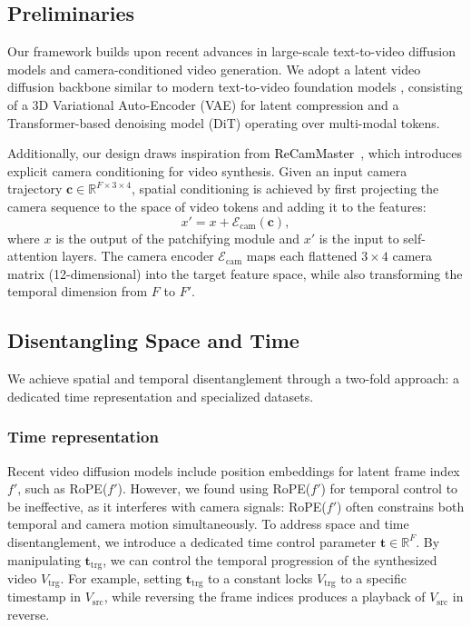 \documentclass[10pt,twocolumn,letterpaper]{article}
\newcommand{\nameCOLOR}[1]{\textcolor{black}{#1}}
\newcommand{\recammaster}{\nameCOLOR{\mbox{ReCamMaster}}\xspace}
\newcommand{\src}{\text{src}}
\newcommand{\trg}{\text{trg}}
\newcommand{\sourcevideo}{V_{\src}}
\newcommand{\targetvideo}{V_{\trg}}
\newcommand{\camera}{\mathbf{c}}
\newcommand{\animatime}{\mathbf{t}}
\newcommand{\numf}{F}
\newcommand{\numflt}{F'}
\newcommand{\camencoder}{\mathcal{E}_\text{cam}}
\begin{document}
\subsection{Preliminaries}
Our framework builds upon recent advances in large-scale text-to-video diffusion models and camera-conditioned video generation. 
We adopt a latent video diffusion backbone similar to modern text-to-video foundation models \cite{wan2025}, consisting of a 3D Variational Auto-Encoder (VAE) for latent compression and a Transformer-based denoising model (DiT) operating over multi-modal tokens. 

Additionally, our design draws inspiration from \recammaster~\cite{Bai2025}, which introduces explicit camera conditioning for video synthesis. 
Given an input camera trajectory $\camera \in \mathbb{R}^{\numf \times 3 \times 4}$, 
spatial conditioning is achieved by first projecting the camera sequence to the space of video tokens and adding it to the features:
\begin{equation}
x' = x + \camencoder\left(\camera\right),
\label{eq:camera-condition}
\end{equation}
where $x$ is the output of the patchifying module and $x'$ is the input to self-attention layers. 
The camera encoder $\camencoder$ maps each flattened $3 \times 4$ camera matrix (12-dimensional) into the target feature space, while also transforming the temporal dimension from $\numf$ to $\numflt$.

\subsection{Disentangling Space and Time}
We achieve spatial and temporal disentanglement through a two-fold approach: a dedicated time representation and specialized datasets.

\subsubsection{Time representation}
\label{sec:time_embedding}
Recent video diffusion models include position embeddings for latent frame index $f'$, such as RoPE($f'$). 
However, we found using RoPE($f'$) for temporal control to be ineffective, as it interferes with camera signals: RoPE($f'$) often constrains both temporal and camera motion simultaneously.
To address space and time disentanglement, we introduce a dedicated time control parameter $\animatime \in \mathbb{R}^F$.
By manipulating $\animatime_\trg$, we can control the temporal progression of the synthesized video $\targetvideo$. For example, setting $\animatime_\trg$ to a constant locks $\targetvideo$ to a specific timestamp in $\sourcevideo$, while reversing the frame indices produces a playback of $\sourcevideo$ in reverse.
\end{document}
